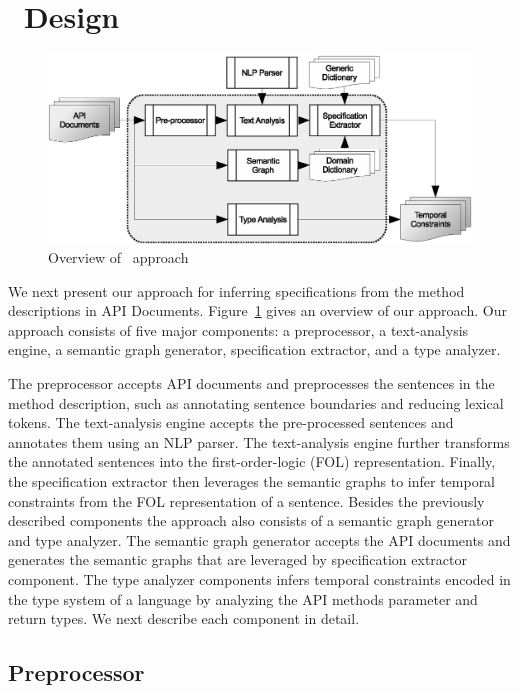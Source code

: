 \section{\tool\ Design}
\label{sec:approach}

\begin{figure}
	\centering
		\includegraphics[scale=0.45]{approach.eps}
	\caption{Overview of \tool\ approach}
	\label{fig:approachOverview}
\end{figure}

We next present our approach for inferring specifications from the method descriptions in API Documents.
Figure~\ref{fig:approachOverview} gives an overview of our approach.
Our approach consists of five major components: a preprocessor, a text-analysis engine, a semantic graph generator, specification extractor, and a type analyzer.

The preprocessor accepts API documents and preprocesses the sentences in the method description, such as annotating sentence boundaries and reducing lexical tokens.
The text-analysis engine accepts the pre-processed sentences and annotates them using an NLP parser.
The text-analysis engine further transforms the annotated sentences into the first-order-logic (FOL) representation.
Finally, the specification extractor then leverages the semantic graphs to infer temporal constraints from the FOL representation of a sentence.
Besides the previously described components the approach also consists of a semantic graph generator and type analyzer.
The semantic graph generator accepts the API documents and generates the semantic graphs that are leveraged by specification extractor component.
The type analyzer components infers temporal constraints encoded in the type system of a language by analyzing the API methods parameter and return types.
We next describe each component in detail.


\subsection{Preprocessor}
\label{sub:prep}

